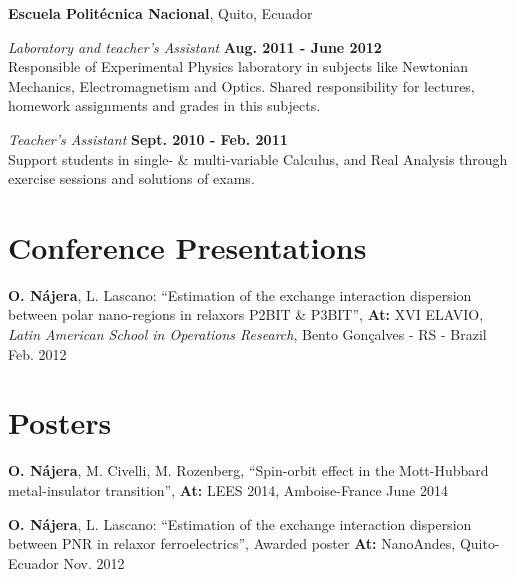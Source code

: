\documentclass[margin,line]{res}
\newenvironment{list1}{
  \begin{list}{\ding{113}}{%
      \setlength{\itemsep}{0in}
      \setlength{\parsep}{0in} \setlength{\parskip}{0in}
      \setlength{\topsep}{0in} \setlength{\partopsep}{0in}
      \setlength{\leftmargin}{0.17in}}}{\end{list}}
\begin{document}
\begin{resume}
  {\bf Escuela Politécnica Nacional}, Quito, Ecuador
  \begin{list1}
   \item[] {\em Laboratory and teacher's Assistant} \hfill {\bf Aug. 2011 - June 2012}\\
    Responsible of Experimental Physics laboratory in subjects
    like Newtonian Mechanics, Electromagnetism and Optics.
    Shared responsibility for lectures, homework assignments and grades in this subjects.\\
   \item[] {\em Teacher's Assistant} \hfill {\bf Sept. 2010 - Feb. 2011}\\
    Support students in single- \& multi-variable Calculus, and Real Analysis through
    exercise sessions and solutions of exams.
  \end{list1}

\section{\sc Conference Presentations}
  {\bf O. Nájera}, L. Lascano: ``Estimation of the exchange interaction dispersion between polar
  nano-regions in relaxors P2BIT \& P3BIT'', {\bf At:} XVI ELAVIO, {\em Latin
American School in Operations Research}, Bento Gonçalves - RS - Brazil Feb. 2012

\section{\sc Posters}
{\bf O. Nájera}, M. Civelli, M. Rozenberg, ``Spin-orbit effect in the
Mott-Hubbard metal-insulator transition'', {\bf At:} LEES 2014, Amboise-France
June 2014

  {\bf O. Nájera}, L. Lascano: ``Estimation of the exchange interaction dispersion between PNR in
  relaxor ferroelectrics'',  Awarded poster {\bf At:} NanoAndes, Quito-Ecuador
Nov. 2012



\end{resume}
\end{document}
